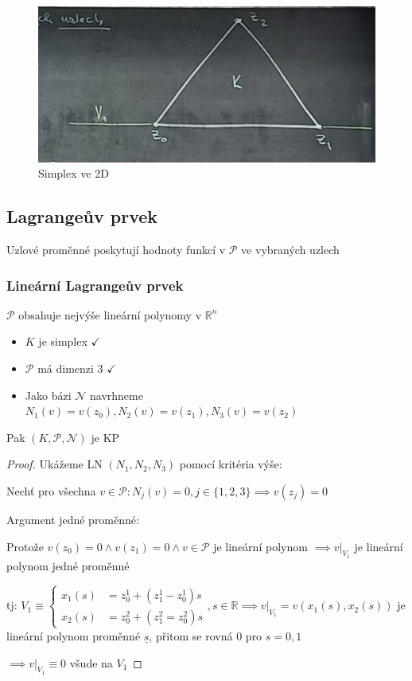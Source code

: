 \documentclass[../main.tex]{subfiles}
\begin{document}
\begin{figure}[ht]
    \centering
    \includegraphics{images/simplex3uzly.png}
    \caption{Simplex ve 2D}
\end{figure}

\subsection{Lagrangeův prvek}
Uzlové proměnné poskytují hodnoty funkcí v $\mathcal{P}$ ve vybraných uzlech

\subsubsection{Lineární Lagrangeův prvek}
$\mathcal{P}$ obsahuje nejvýše lineární polynomy v $\mathbb{R}^n$

\begin{itemize}
    \item $K$ je simplex $\checkmark$
    \item $\mathcal{P}$ má dimenzi 3 $\checkmark$
    \item Jako bázi $\mathcal{N}$ navrhneme  $N_1(v)=v(z_0), N_2(v) = v(z_1), N_3(v)=v(z_2)$
\end{itemize} 

\begin{lemma}
    Pak $(K, \mathcal{P}, \mathcal{N})$ je KP
\end{lemma}
\begin{proof}
       Ukážeme LN $(N_1,N_2,N_3)$ pomocí kritéria výše:

       Nechť pro všechna $v\in\mathcal{P}: N_j(v) = 0, j\in\{1,2,3\}\implies v(z_j)=0$
       
       Argument jedné proměnné:

       Protože $v(z_0)=0\wedge v(z_1)=0 \wedge v\in\mathcal{P}$ je lineární polynom $\implies v|_{V_1}$ je lineární polynom jedné proměnné

       tj: $V_1 \equiv  \begin{cases}
        x_1(s) &= z_0^1 + (z_1^1 - z_0^1)s \\
        x_2(s) &= z_0^2 + (z_1^2 = z_0^2)s 
    \end{cases}, s\in\mathbb{R}
    \implies v|_{V_1} = v(x_1(s), x_2(s))$ je lineární polynom proměnné $\underline{s}$, přitom se rovná $0$ pro $ s=0,1$

    $\implies v|_{V_1}\equiv 0$ všude na $V_1$

\end{proof}
\end{document}

